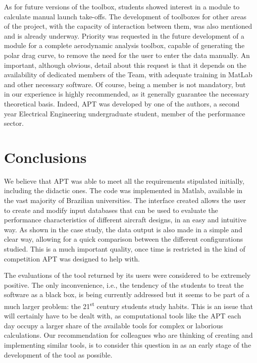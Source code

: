 \documentclass[10pt]{SelfArx} %
\begin{document}
As for future versions of the toolbox, students showed interest in a module to calculate manual launch take-offs. The development of toolboxes for other areas of the project, with the capacity of interaction  between them, was also mentioned and is already underway. Priority was requested in the future development of a module for a complete aerodynamic analysis toolbox, capable of generating the polar drag curve, to remove the need for the user to enter the  data manually. An important, although obvious, detail about this request is that it depends on the availability of dedicated members of the Team, with adequate training in MatLab\textsuperscript{\textregistered} and other necessary software. Of course, being a member is not mandatory, but in our experience is highly recommended, as it generally guarantee the necessary theoretical basis.  Indeed, APT was developed by one of the authors, a second year Electrical Engineering undergraduate student, member of the performance sector. 


\section{Conclusions}

We believe that APT was able to meet all the requirements stipulated initially, including the didactic ones. The code was implemented in Matlab\textsuperscript{\textregistered},  available in the vast majority of Brazilian universities. The interface created allows the user to create and modify input databases that  can be used to evaluate the performance characteristics of different aircraft designs, in an easy and intuitive way. As shown in the case study, the data output is also made in a simple and clear way, allowing for a quick comparison between the different  configurations studied. This is a much important  quality, once time is restricted in the kind of competition APT was designed to help with. 

The evaluations of the tool returned by its users were considered to be extremely positive. The only inconvenience, i.e., the tendency of the students to treat the software as a black box, is being currently addressed but it seems to be part of a much larger problem: the 21\textsuperscript{st} century students study habits. This is an issue that will certainly  have to be dealt with, as computational  tools like the APT each day occupy a larger share  of the  available tools for complex or laborious calculations. Our recommendation for colleagues  who are thinking of creating and implementing similar tools, is to consider this question in as an early stage of the development of the tool as possible.  
\end{document}
